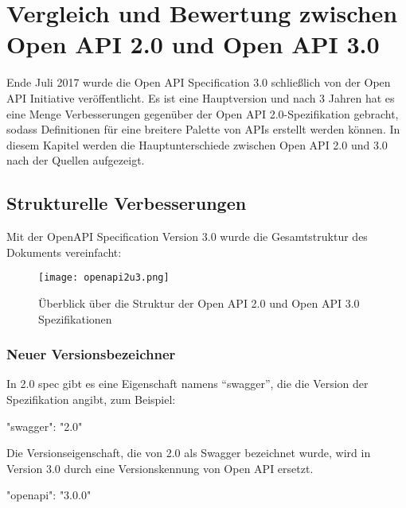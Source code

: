\chapter{Vergleich und Bewertung zwischen Open API 2.0 und Open API 3.0}
\label{cha:k6}
Ende Juli 2017 wurde die Open API Specification 3.0 schließlich von der Open API Initiative veröffentlicht. Es ist eine Hauptversion und nach 3 Jahren hat es eine Menge Verbesserungen gegenüber der Open API 2.0-Spezifikation gebracht, sodass Definitionen für eine breitere Palette von APIs erstellt werden können. In diesem Kapitel werden die Hauptunterschiede zwischen Open API 2.0 und 3.0 nach der Quellen\cite{swagger20Github, openapi20Github} aufgezeigt.

\section{Strukturelle Verbesserungen}

Mit der OpenAPI Specification Version 3.0 wurde die Gesamtstruktur des Dokuments vereinfacht:

\begin{figure}[h]
	\centering
	\texttt{[image: openapi2u3.png]}
	\caption{Überblick über die Struktur der Open API 2.0 und Open API 3.0 Spezifikationen\cite{openapi2u317}}
	\label{openapi2u317-1}
\end{figure}

\subsection{Neuer Versionsbezeichner}

In 2.0 spec gibt es eine Eigenschaft namens "`swagger"', die die Version der Spezifikation angibt, zum Beispiel:\\

\begin{LaTeXCode}[caption={Version von Swagger},captionpos=b, label=LaTeXCode:swagger2.0-1][numbers=none]
"swagger": "2.0"\\
\end{LaTeXCode}

Die Versionseigenschaft, die von 2.0 als Swagger bezeichnet wurde, wird in Version 3.0 durch eine Versionskennung von Open API ersetzt.\\

\begin{LaTeXCode}[caption={Version von Open API},captionpos=b, label=LaTeXCode:openapi3.0-1][numbers=none]
"openapi": "3.0.0"\\
\end{LaTeXCode}

